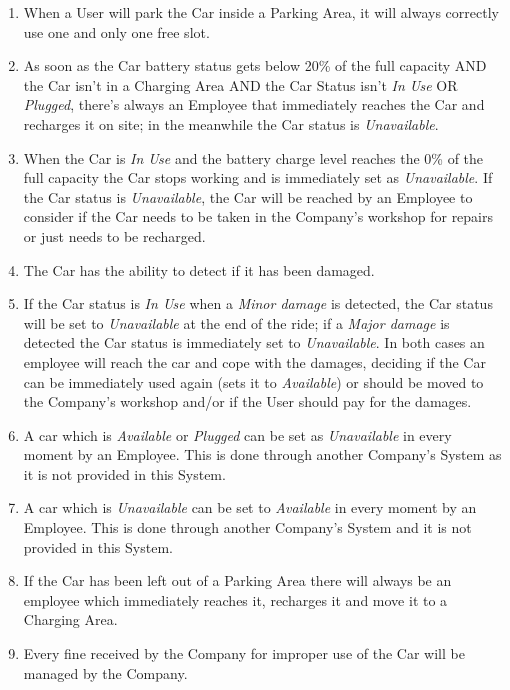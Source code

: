 \begin{enumerate}
	\item When a User will park the Car inside a Parking Area, it will always correctly use one and only one free slot.
	\item As soon as the Car battery status gets below 20\% of the full capacity AND the Car isn't in a Charging Area AND the Car Status isn't \textit{In Use} OR \textit{Plugged}, there's always an Employee that immediately reaches the Car and recharges it on site; in the meanwhile the Car status is \textit{Unavailable}.	
	\item When the Car is \textit{In Use} and the battery charge level reaches the 0\% of the full capacity the Car stops working and is immediately set as \textit{Unavailable}.
	If the Car status is \textit{Unavailable}, the Car will be reached by an Employee to consider if the Car needs to be taken in the Company's workshop for repairs or just needs to be recharged.
	\item The Car has the ability to detect if it has been damaged. 
	\item If the Car status is \textit{In Use} when a \textit{Minor damage} is detected, the Car status will be set to \textit{Unavailable} at the end of the ride; if a \textit{Major damage} is detected the Car status is immediately set to \textit{Unavailable}. In both cases an employee will reach the car and cope with the damages, deciding if the Car can be immediately used again (sets it to \textit{Available}) or should be moved to the Company's workshop and/or if the User should pay for the damages. 
	\item A car which is \textit{Available} or \textit{Plugged} can be set as \textit{Unavailable} in every moment by an Employee. This is done through another Company's System as it is not provided in this System.
	\item A car which is \textit{Unavailable} can be set to \textit{Available} in every moment by an Employee.  This is done through another Company's System and it is not provided in this System.
	\item If the Car has been left out of a Parking Area there will always be an employee which immediately reaches it, recharges it and move it to a Charging Area. 
	\item Every fine received by the Company for improper use of the Car will be managed by the Company.
	
\end{enumerate}

\clearpage